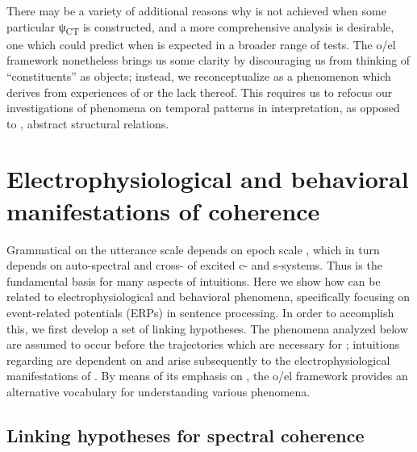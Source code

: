   There may be a variety of additional reasons why  is not achieved when some particular ψ\textsubscript{CT} is constructed, and a more comprehensive analysis is desirable, one which could predict when  is expected in a broader range of  tests. The o/el framework nonetheless brings us some clarity by discouraging us from thinking of “constituents” as objects; instead, we reconceptualize  as a phenomenon which derives from experiences of  or the lack thereof. This requires us to refocus our investigations of  phenomena on temporal patterns in interpretation, as opposed to , abstract structural relations.

\section{Electrophysiological and behavioral manifestations of coherence}

Grammatical  on the utterance scale depends on epoch scale , which in turn depends on auto-spectral and cross- of excited c- and s-systems. Thus  is the fundamental basis for many aspects of  intuitions. Here we show how  can be related to electrophysiological and behavioral phenomena, specifically focusing on event-related potentials (ERPs) in sentence processing. In order to accomplish this, we first develop a set of linking hypotheses. The  phenomena analyzed below are assumed to occur before the  trajectories which are necessary for ; intuitions regarding  are dependent on and arise subsequently to the electrophysiological manifestations of . By means of its emphasis on , the o/el framework provides an alternative vocabulary for understanding various  phenomena.

\subsection{Linking hypotheses for spectral coherence}

